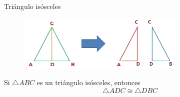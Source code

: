\begin{infocard}{Triángulo isósceles}
    \begin{figure}[H]
        \centering
        \includegraphics[width=0.9\linewidth]{../images/triangulo_isosceles.png}
        \caption{}
        \label{fig:20230402132954}
    \end{figure}
    Si $\triangle ABC$ es un triángulo isósceles, entonces \[\triangle ADC \cong \triangle DBC\]









\end{infocard}